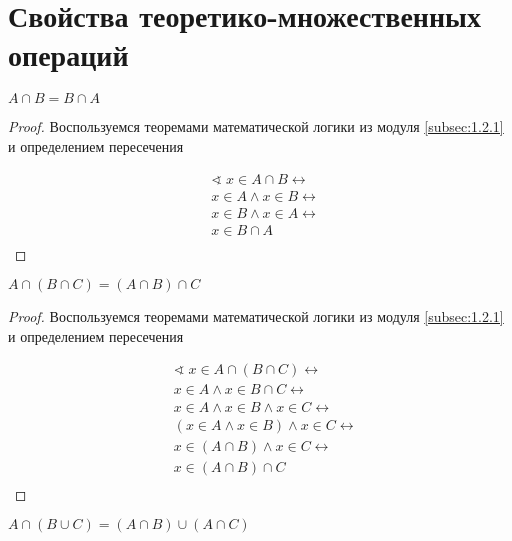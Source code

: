\section{Свойства теоретико-множественных операций}

\begin{theorem}
    $A \cap B = B \cap A$
\end{theorem}

\begin{proof}
    Воспользуемся теоремами математической логики из модуля \ref{subsec:1.2.1} и определением пересечения

    \begin{align*}
        & \sphericalangle \; x \in A \cap B \leftrightarrow \\
        & x \in A \land x \in B \leftrightarrow \\
        & x \in B \land x \in A \leftrightarrow \\
        & x \in B \cap A \\
    \end{align*}
\end{proof}

\begin{theorem}
    $A \cap (B \cap C) = (A \cap B) \cap C$
\end{theorem}

\begin{proof}
    Воспользуемся теоремами математической логики из модуля \ref{subsec:1.2.1} и определением пересечения

    \begin{align*}
        & \sphericalangle \; x \in A \cap (B \cap C) \leftrightarrow \\
        & x \in A \land x \in B \cap C \leftrightarrow \\
        & x \in A \land x \in B \land x \in C \leftrightarrow \\
        & (x \in A \land x \in B) \land x \in C \leftrightarrow \\
        & x \in (A \cap B) \land x \in C \leftrightarrow \\
        & x \in (A \cap B) \cap C \\
    \end{align*}
\end{proof}

\begin{theorem}
    \hfill \break \break
    $A \cap (B \cup C) = (A \cap B) \cup (A \cap C)$
\end{theorem}

